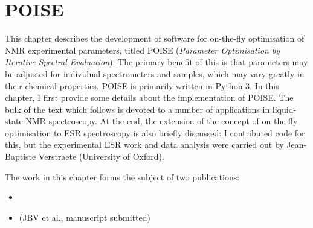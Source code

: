 \chapter{POISE}
\label{chpt:poise}

This chapter describes the development of software for on-the-fly optimisation of NMR experimental parameters, titled POISE (\textit{Parameter Optimisation by Iterative Spectral Evaluation}).
The primary benefit of this is that parameters may be adjusted for individual spectrometers and samples, which may vary greatly in their chemical properties.
POISE is primarily written in Python 3.
In this chapter, I first provide some details about the implementation of POISE.
The bulk of the text which follows is devoted to a number of applications in liquid-state NMR spectroscopy.
At the end, the extension of the concept of on-the-fly optimisation to ESR spectroscopy is also briefly discussed: I contributed code for this, but the experimental ESR work and data analysis were carried out by Jean-Baptiste Verstraete (University of Oxford).

The work in this chapter forms the subject of two publications:

\begin{itemize}
    \item {}
    \item (JBV et al., manuscript submitted)
\end{itemize}

\clearpage






\printbibliography[heading=subbibnumbered]{}
